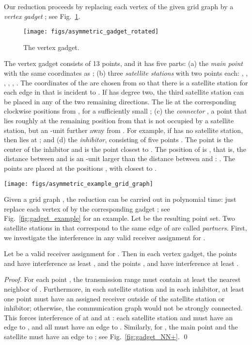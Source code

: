 \documentclass[envcountsect,envcountsame,runningheads,a4paper]{llncs}
\begin{document}
Our reduction proceeds by replacing each vertex 
of the given grid graph  by a \emph{vertex gadget} ;
see Fig.~\ref{fig:gadget_bare}.
\begin{figure}[b]
  \centering
  \texttt{[image: figs/asymmetric\_gadget\_rotated]}
  \caption{The vertex gadget. }
  \label{fig:gadget_bare}
\end{figure}
The vertex gadget consists of 13 points, and it has five parts:
(a) the \emph{main point}  with
the same coordinates as ;
(b) three \emph{satellite stations}
with two points each: , ,
, , , .
The coordinates of the  are
chosen from 
so that there is a satellite station for each
edge in  that is incident to . If  has degree two, the third 
satellite station can be placed in any of the two remaining directions.
The  lie
at the corresponding clockwise positions from
,
for a sufficiently small ;
(c) the \emph{connector} , a point
that lies roughly at the remaining position from
 that is
not occupied by a satellite station, but
an -unit further away from . For example,
if  has no satellite station, then  lies
at ; and
(d) the \emph{inhibitor}, consisting of five
points .
The point  is the center of the inhibitor
and  is the point closest to .
The position of  is
, that is,
the distance between  and
 is an -unit larger than the distance  between 
and :
.
The points  are placed at
the positions ,
with  closest to .

\begin{figure*}
  \centering
  \texttt{[image: figs/asymmetric\_example\_grid\_graph]}
  \caption{An example reduction.}
  \label{fig:gadget_example}
\end{figure*}

Given a grid graph , the reduction can be
carried out in polynomial time: just replace each
vertex  of  by the corresponding gadget ; see
Fig.~\ref{fig:gadget_example} for an example.
Let  be the resulting point set.
Two satellite stations in  that correspond to the same
edge of  are called \emph{partners}.
First, we investigate the interference in any valid
receiver assignment for .

\begin{lemma}
\label{lem:gadget_NN}
Let  be a valid receiver assignment for .
Then in each vertex gadget, the points  and 
have interference as least ,
and the points , and  have interference at
least .
\end{lemma}

\begin{proof}
For each point , the transmission
range  must contain
at least the nearest
neighbor of . Furthermore, in each
satellite station and in each inhibitor,
at least one point must have an assigned receiver outside
of the satellite station or inhibitor; otherwise,
the communication graph  would not be strongly connected.
This forces interference of  at  and at : each satellite
station and  must have
an edge to , and  all must have an
edge to . Similarly, for , the main
point  and the satellite  must have an edge to ;
see Fig.~\ref{fig:gadget_NN+}.
\qed{}
\end{proof}
\end{document}
